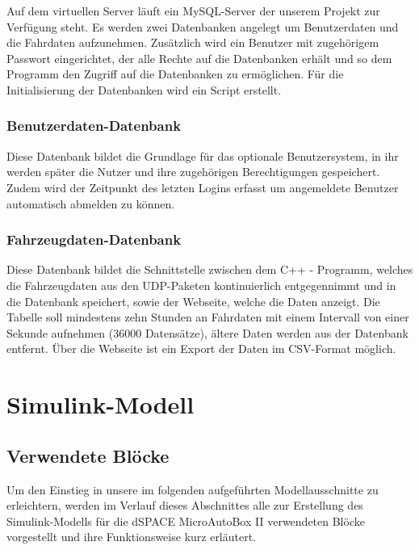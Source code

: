 \documentclass[fontsize = 12pt, paper = a4]{scrreprt}
\begin{document}
Auf dem virtuellen Server läuft ein MySQL-Server der unserem Projekt zur Verfügung steht. Es werden zwei Datenbanken angelegt um Benutzerdaten und die Fahrdaten aufzunehmen. Zusätzlich wird ein Benutzer mit zugehörigem Passwort eingerichtet, der alle Rechte auf die Datenbanken erhält und so dem Programm den Zugriff auf die Datenbanken zu ermöglichen. Für die Initialisierung der Datenbanken wird ein Script erstellt.

\subsubsection{Benutzerdaten-Datenbank}

Diese Datenbank bildet die Grundlage für das optionale Benutzersystem, in ihr werden später die Nutzer und ihre zugehörigen Berechtigungen gespeichert. Zudem wird der Zeitpunkt des letzten Logins erfasst um angemeldete Benutzer automatisch abmelden zu können.

\subsubsection{Fahrzeugdaten-Datenbank}

Diese Datenbank bildet die Schnittstelle zwischen dem C++ - Programm, welches die Fahrzeugdaten aus den UDP-Paketen kontinuierlich entgegennimmt und in die Datenbank speichert, sowie der Webseite, welche die Daten anzeigt. Die Tabelle soll mindestens zehn Stunden an Fahrdaten mit einem Intervall von einer Sekunde aufnehmen (36000 Datensätze), ältere Daten werden aus der Datenbank entfernt. Über die Webseite ist ein Export der Daten im CSV-Format möglich. 



\section{Simulink-Modell}
\subsection{Verwendete Blöcke}

Um den Einstieg in unsere im folgenden aufgeführten Modellausschnitte  zu erleichtern, werden im Verlauf dieses Abschnittes alle zur Erstellung des Simulink-Modells für die dSPACE MicroAutoBox II verwendeten Blöcke vorgestellt und ihre Funktionsweise kurz erläutert. 
\end{document}
